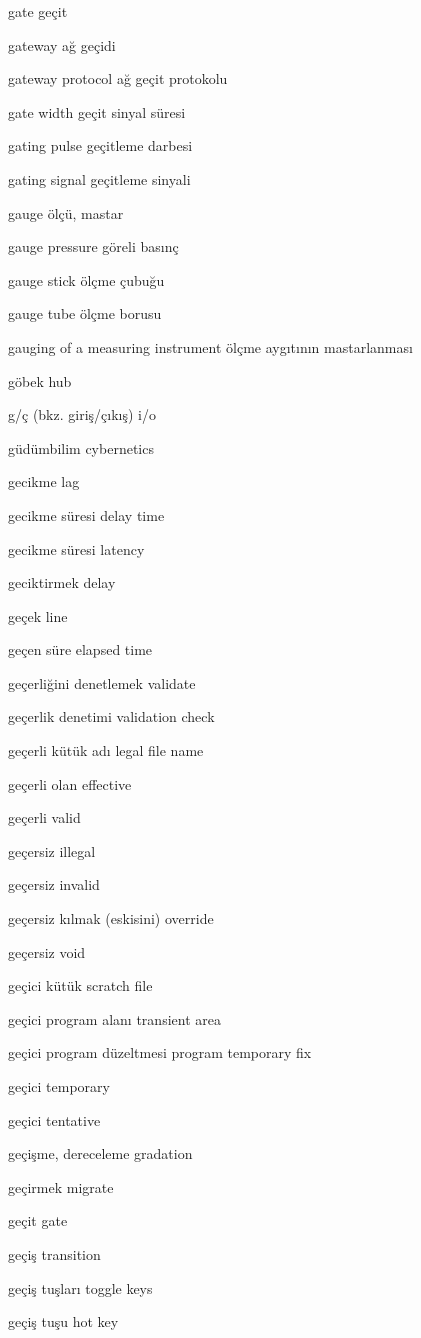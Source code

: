 \documentclass[12pt,fleqn]{article}\usepackage{../../common}
\begin{document}
gate geçit

gateway ağ geçidi

gateway protocol ağ geçit protokolu

gate width geçit sinyal süresi

gating pulse geçitleme darbesi

gating signal geçitleme sinyali

gauge ölçü, mastar

gauge pressure göreli basınç

gauge stick ölçme çubuğu

gauge tube ölçme borusu

gauging of a measuring instrument ölçme aygıtının mastarlanması

göbek hub

g/ç (bkz. giriş/çıkış) i/o

güdümbilim cybernetics

gecikme lag

gecikme süresi delay time

gecikme süresi latency

geciktirmek delay

geçek line

geçen süre elapsed time

geçerliğini denetlemek validate

geçerlik denetimi validation check

geçerli kütük adı legal file name

geçerli olan effective

geçerli valid

geçersiz illegal

geçersiz invalid

geçersiz kılmak (eskisini) override

geçersiz void

geçici kütük scratch file

geçici program alanı transient area

geçici program düzeltmesi program temporary fix

geçici temporary

geçici tentative

geçişme, dereceleme gradation

geçirmek migrate

geçit gate

geçiş transition

geçiş tuşları toggle keys

geçiş tuşu hot key
\end{document}
